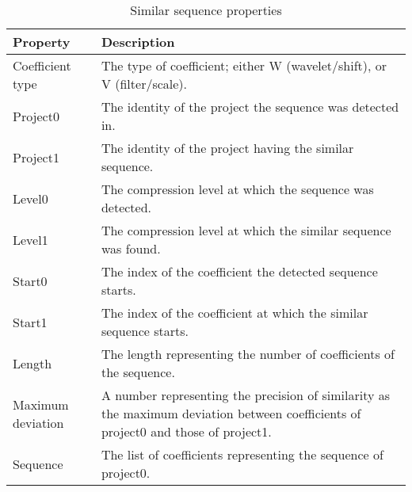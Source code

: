 \begin{table}[H]
\caption{Similar sequence properties}\label{table:sequence_props}
\centering
\begin{tabular}{lp{10cm}}
\hline
	\textbf{Property} & \textbf{Description} \\
	\hline
	Coefficient type & The type of coefficient; either
	W (wavelet/shift), or V (filter/scale). \\
	Project0 & The identity of the project the sequence was detected in. \\
	Project1 & The identity of the project having the similar sequence. \\
	Level0 & The compression level at which the sequence was detected. \\
	Level1 & The compression level at which the similar sequence was found. \\
	Start0 & The index of the coefficient the detected sequence starts. \\
	Start1 & The index of the coefficient at which the similar sequence starts. \\
	Length & The length representing the number of coefficients of the sequence. \\
	Maximum deviation & A number representing the precision of similarity as the
	maximum deviation between coefficients of project0 and those of project1. \\
	Sequence & The list of coefficients representing the sequence of project0. \\
\hline
\end{tabular}
\end{table}